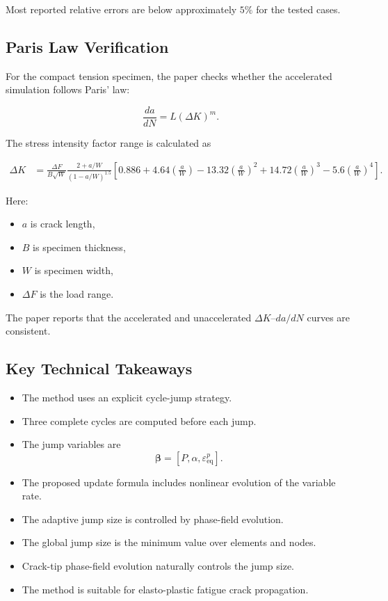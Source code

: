 ﻿\documentclass[11pt,a4paper]{article}
\begin{document}
Most reported relative errors are below approximately $5\%$ for the tested cases.

\subsection{Paris Law Verification}

For the compact tension specimen, the paper checks whether the accelerated simulation follows Paris' law:

\[
\frac{da}{dN}
=
L(\Delta K)^m.
\]

The stress intensity factor range is calculated as

\[
\begin{aligned}
\Delta K
&=
\frac{\Delta F}{B\sqrt{W}}
\frac{2+a/W}{(1-a/W)^{1.5}}
\left[
0.886
+
4.64\left(\frac{a}{W}\right)
-
13.32\left(\frac{a}{W}\right)^2
+
14.72\left(\frac{a}{W}\right)^3
-
5.6\left(\frac{a}{W}\right)^4
\right].
\end{aligned}
\]

Here:

\begin{itemize}[leftmargin=*]
    \item $a$ is crack length,
    \item $B$ is specimen thickness,
    \item $W$ is specimen width,
    \item $\Delta F$ is the load range.
\end{itemize}

The paper reports that the accelerated and unaccelerated $\Delta K$--$da/dN$ curves are consistent.

\subsection{Key Technical Takeaways}

\begin{itemize}[leftmargin=*]
    \item The method uses an explicit cycle-jump strategy.
    \item Three complete cycles are computed before each jump.
    \item The jump variables are
    \[
    \bm{\beta}
    =
    [P,\alpha,\varepsilon_{\mathrm{eq}}^p].
    \]
    \item The proposed update formula includes nonlinear evolution of the variable rate.
    \item The adaptive jump size is controlled by phase-field evolution.
    \item The global jump size is the minimum value over elements and nodes.
    \item Crack-tip phase-field evolution naturally controls the jump size.
    \item The method is suitable for elasto-plastic fatigue crack propagation.
\end{itemize}
\end{document}
